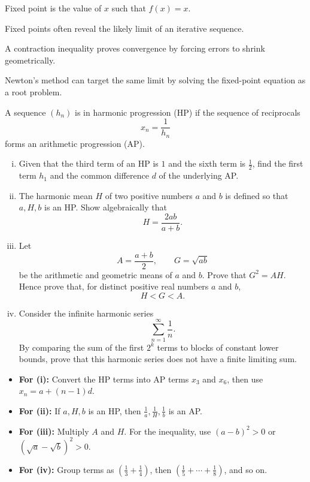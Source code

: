 \begin{takeaways}
\item Fixed point is the value of $x$ such that $f(x)=x$.
\item Fixed points often reveal the likely limit of an iterative sequence.
\item A contraction inequality proves convergence by forcing errors to shrink geometrically.
\item Newton's method can target the same limit by solving the fixed-point equation as a root problem.
\end{takeaways}

\begin{problem}
A sequence $(h_n)$ is in harmonic progression (HP) if the sequence of reciprocals
\[
x_n=\frac{1}{h_n}
\]
forms an arithmetic progression (AP).

\begin{enumerate}[(i)]
\item Given that the third term of an HP is $1$ and the sixth term is $\frac12$, find the first term $h_1$ and the common difference $d$ of the underlying AP.
\item The harmonic mean $H$ of two positive numbers $a$ and $b$ is defined so that $a,H,b$ is an HP. Show algebraically that
\[
H=\frac{2ab}{a+b}.
\]
\item Let
\[
A=\frac{a+b}{2},\qquad G=\sqrt{ab}
\]
be the arithmetic and geometric means of $a$ and $b$. Prove that $G^2=AH$. Hence prove that, for distinct positive real numbers $a$ and $b$,
\[
H<G<A.
\]
\item Consider the infinite harmonic series
\[
\sum_{n=1}^{\infty}\frac1n.
\]
By comparing the sum of the first $2^k$ terms to blocks of constant lower bounds, prove that this harmonic series does not have a finite limiting sum.
\end{enumerate}
\end{problem}
\newpage
\begin{hint}
\begin{itemize}
\item \textbf{For (i):} Convert the HP terms into AP terms $x_3$ and $x_6$, then use $x_n=a+(n-1)d$.
\item \textbf{For (ii):} If $a,H,b$ is an HP, then $\frac1a,\frac1H,\frac1b$ is an AP.
\item \textbf{For (iii):} Multiply $A$ and $H$. For the inequality, use $(a-b)^2>0$ or $(\sqrt a-\sqrt b)^2>0$.
\item \textbf{For (iv):} Group terms as $\left(\frac13+\frac14\right)$, then $\left(\frac15+\cdots+\frac18\right)$, and so on.
\end{itemize}
\end{hint}
